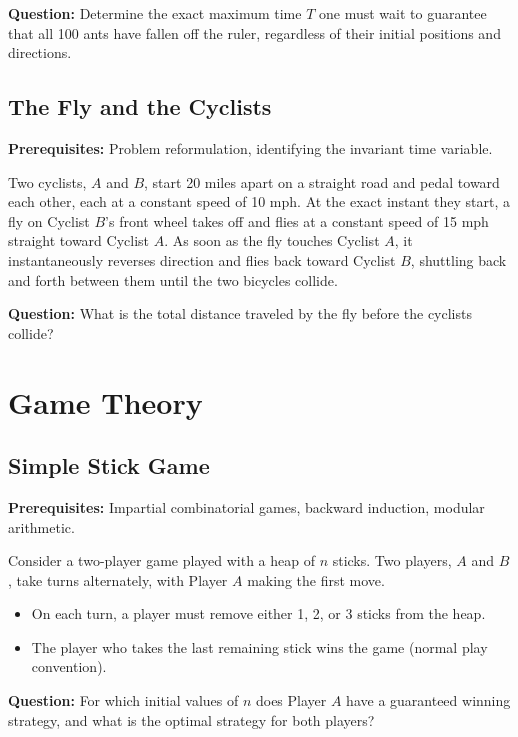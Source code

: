 \documentclass[12pt]{article}
\begin{document}
\textbf{Question:} Determine the exact maximum time $T$ one must wait to guarantee that all 100 ants have fallen off the ruler, regardless of their initial positions and directions.

\subsection{The Fly and the Cyclists}
\textbf{Prerequisites:} Problem reformulation, identifying the invariant time variable.

Two cyclists, $A$ and $B$, start 20 miles apart on a straight road and pedal toward each other, each at a constant speed of 10 mph. At the exact instant they start, a fly on Cyclist $B$'s front wheel takes off and flies at a constant speed of 15 mph straight toward Cyclist $A$. As soon as the fly touches Cyclist $A$, it instantaneously reverses direction and flies back toward Cyclist $B$, shuttling back and forth between them until the two bicycles collide.

\textbf{Question:} What is the total distance traveled by the fly before the cyclists collide?

\section{Game Theory}

\subsection{Simple Stick Game}
\textbf{Prerequisites:} Impartial combinatorial games, backward induction, modular arithmetic.

Consider a two-player game played with a heap of $n$ sticks. Two players, $A$ and $B$, take turns alternately, with Player $A$ making the first move.
\begin{itemize}
    \item On each turn, a player must remove either 1, 2, or 3 sticks from the heap.
    \item The player who takes the last remaining stick wins the game (normal play convention).
\end{itemize}

\textbf{Question:} For which initial values of $n$ does Player $A$ have a guaranteed winning strategy, and what is the optimal strategy for both players?
\end{document}
